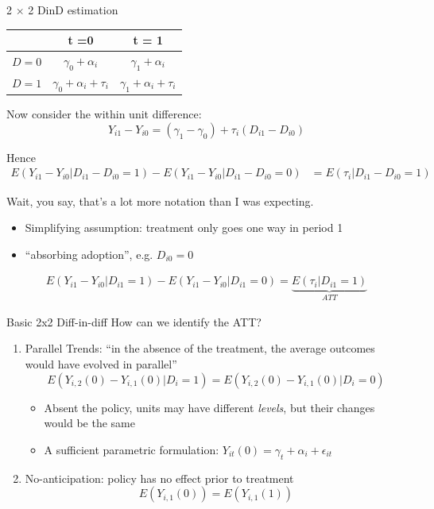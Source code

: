 \documentclass[notes,11pt, aspectratio=169]{beamer}
\newenvironment{wideitemize}{\itemize\addtolength{\itemsep}{10pt}}{\enditemize}
\begin{document}
\begin{frame}{2 $\times$ 2 DinD estimation}
      \begin{center}
        \begin{tabular}{c|cc}
          & t =0 & t = 1\\
          \midrule
          $D = 0$ &  $\gamma_{0} + \alpha_{i}$  & $ \gamma_{1} + \alpha_{i}$\\
          $D = 1$ &  $ \gamma_{0} + \alpha_{i} + \tau_{i} $ & $\gamma_{1} + \alpha_{i} + \tau_{i}$
      \end{tabular}
    \end{center}
    \begin{wideitemize}
    \item Now consider the within unit difference:
      $$Y_{i1} - Y_{i0} = (\gamma_{1} - \gamma_{0}) + \tau_{i}(D_{i1} - D_{i0})$$
    \item Hence 
    \begin{align*}
      E(Y_{i1} - Y_{i0} | D_{i1} - D_{i0} = 1) - E(Y_{i1} - Y_{i0} | D_{i1} - D_{i0} = 0) &= E(\tau_{i}  | D_{i1} - D_{i0} = 1) 
    \end{align*}
  \item Wait, you say, that's a lot more notation than I was expecting.
    \begin{itemize}
    \item Simplifying assumption: treatment only goes one way in
      period 1
    \item  ``absorbing adoption'', e.g. $D_{i0} = 0$
    \end{itemize}
    \begin{align*}
      E(Y_{i1} - Y_{i0} | D_{i1} = 1) - E(Y_{i1} - Y_{i0} | D_{i1} = 0) =  \underbrace{E(\tau_{i}  | D_{i1} = 1) }_{ATT}
    \end{align*}
  \end{wideitemize}
\end{frame}


\begin{frame}{Basic 2x2 Diff-in-diff}
  How can we identify the ATT?
  \begin{enumerate}
  \item Parallel Trends: ``in the absence of the treatment, the average outcomes would have evolved in parallel''
    \begin{equation*}
        E(Y_{i,2}(0) - Y_{i,1}(0) | D_{i} = 1) =     E(Y_{i,2}(0) - Y_{i,1}(0) | D_{i} = 0)
      \end{equation*}
      \begin{itemize}
      \item Absent the policy, units may have different \emph{levels}, but their changes would be the same
      \item A sufficient parametric formulation: $Y_{it}(0) = \gamma_{t} + \alpha_{i} + \epsilon_{it}$
      \end{itemize}
    \item No-anticipation: policy has no effect prior to treatment
    \begin{equation*}
        E(Y_{i,1}(0)) = E(Y_{i,1}(1))
      \end{equation*}
    \end{enumerate}
\end{frame}
\end{document}
